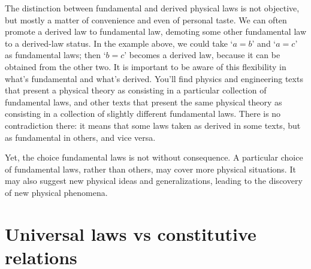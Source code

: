 \documentclass[a4paper,12pt,%
onecolumn,oneside,%
british%
]{memoir}
\renewcommand*{\|}[1][]{\nonscript\:#1\vert\nonscript\:\mathopen{}}
\begin{document}
%
%
The distinction between fundamental and derived physical laws is not objective, but mostly a matter of convenience and even of personal taste. We can often promote a derived law to fundamental law, demoting some other fundamental law to a derived-law status. In the example above, we could take \enquote*{$a=b$} and \enquote*{$a=c$} as fundamental laws; then \enquote*{$b=c$} becomes a derived law, because it can be obtained from the other two. It is important to be aware of this flexibility in what's fundamental and what's derived. You'll find physics and engineering texts that present a physical theory as consisting in a particular collection of fundamental laws, and other texts that present the same physical theory as consisting in a collection of slightly different fundamental laws. There is no contradiction there: it means that some laws taken as derived in some texts, but as fundamental in others, and vice versa.

Yet, the choice fundamental laws is not without consequence. A particular choice of fundamental laws, rather than others, may cover more physical situations. It may also suggest new physical ideas and generalizations, leading to the discovery of new physical phenomena.


\section{Universal laws vs constitutive relations}
\label{sec:universal_constitutive}
\end{document}

